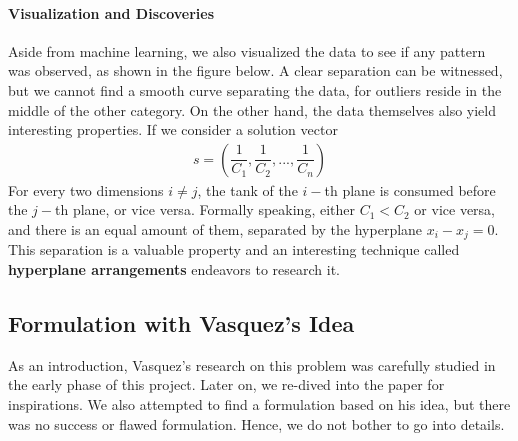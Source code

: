 \documentclass[12pt,letterpaper]{article}
\begin{document}
\paragraph{Visualization and Discoveries}
Aside from machine learning, we also visualized the data to see if any pattern was observed, as shown in the figure below. 
A clear separation can be witnessed, but we cannot find a smooth curve separating the data, for outliers reside 
in the middle of the other category. 
On the other hand, the data themselves also yield interesting properties. If we consider a solution vector 
\begin{align*}
 s = \left( \dfrac{1}{C_1}, \dfrac{1}{C_2}, ..., \dfrac{1}{C_n} \right)
\end{align*}
For every two dimensions $ i \neq j$, the tank of the $i-$th plane is consumed before the $j-$th plane, or vice versa.
Formally speaking, either $C_1 < C_2$ or vice versa, and there is an equal amount of them, separated by the hyperplane 
$x_i - x_j = 0$. This separation is a valuable property and an interesting technique called \textbf{hyperplane arrangements} 
endeavors to research it.

\subsection{Formulation with Vasquez's Idea}
As an introduction, Vasquez's research \cite{vasquez2015airplane} on this problem was carefully studied 
in the early phase of this project. Later on, we re-dived into the paper for inspirations.
We also attempted to find a formulation based on his idea, but there was no success or flawed formulation. 
Hence, we do not bother to go into details. 
\end{document}
